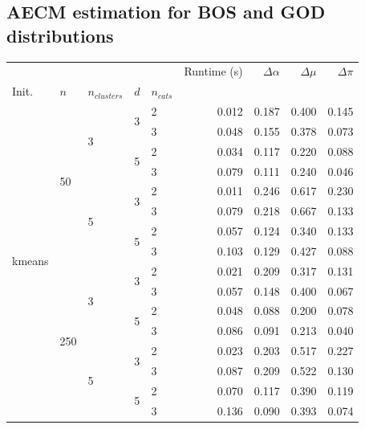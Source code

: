 \subsection{AECM estimation for BOS and GOD distributions}
\begin{table}[H]
\centering
\begin{minipage}{.48\columnwidth}
\begin{adjustbox}{width=\columnwidth}
\begin{tabular}{lllllrrrr}
\toprule
 &  &  &  &  & Runtime (s) & $\Delta \alpha$ & $\Delta \mu$ & $\Delta \pi$ \\
Init. & $n$ & $n_{clusters}$ & $d$ & $n_{cats}$ &  &  &  &  \\
\midrule
\multirow[t]{16}{*}{kmeans} & \multirow[t]{8}{*}{50} & \multirow[t]{4}{*}{3} & \multirow[t]{2}{*}{3} & 2 & 0.012 & 0.187 & 0.400 & 0.145 \\
 &  &  &  & 3 & 0.048 & 0.155 & 0.378 & 0.073 \\
\cline{4-9}
 &  &  & \multirow[t]{2}{*}{5} & 2 & 0.034 & 0.117 & 0.220 & 0.088 \\
 &  &  &  & 3 & 0.079 & 0.111 & 0.240 & 0.046 \\
\cline{3-9} \cline{4-9}
 &  & \multirow[t]{4}{*}{5} & \multirow[t]{2}{*}{3} & 2 & 0.011 & 0.246 & 0.617 & 0.230 \\
 &  &  &  & 3 & 0.079 & 0.218 & 0.667 & 0.133 \\
\cline{4-9}
 &  &  & \multirow[t]{2}{*}{5} & 2 & 0.057 & 0.124 & 0.340 & 0.133 \\
 &  &  &  & 3 & 0.103 & 0.129 & 0.427 & 0.088 \\
\cline{2-9} \cline{3-9} \cline{4-9}
 & \multirow[t]{8}{*}{250} & \multirow[t]{4}{*}{3} & \multirow[t]{2}{*}{3} & 2 & 0.021 & 0.209 & 0.317 & 0.131 \\
 &  &  &  & 3 & 0.057 & 0.148 & 0.400 & 0.067 \\
\cline{4-9}
 &  &  & \multirow[t]{2}{*}{5} & 2 & 0.048 & 0.088 & 0.200 & 0.078 \\
 &  &  &  & 3 & 0.086 & 0.091 & 0.213 & 0.040 \\
\cline{3-9} \cline{4-9}
 &  & \multirow[t]{4}{*}{5} & \multirow[t]{2}{*}{3} & 2 & 0.023 & 0.203 & 0.517 & 0.227 \\
 &  &  &  & 3 & 0.087 & 0.209 & 0.522 & 0.130 \\
\cline{4-9}
 &  &  & \multirow[t]{2}{*}{5} & 2 & 0.070 & 0.117 & 0.390 & 0.119 \\
 &  &  &  & 3 & 0.136 & 0.090 & 0.393 & 0.074 \\

\end{tabular}
\end{adjustbox}
\end{minipage}
\end{table}
